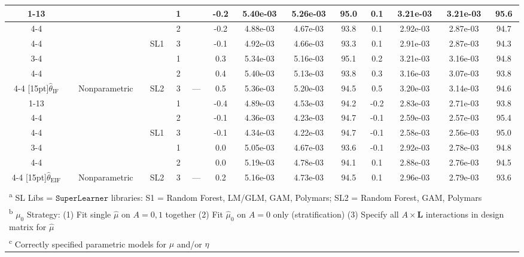 \begin{table}
\begin{tabular}[t]{ccccccccccccc}
\cmidrule{1-13}
 &  &  &  1 &  & -0.2 & 5.40e-03 & 5.26e-03 & 95.0 & 0.1 & 3.21e-03 & 3.21e-03 & 95.6\\
\cmidrule{4-4}
\cmidrule{6-13}
 &  &  &  2 &  & -0.2 & 4.88e-03 & 4.67e-03 & 93.8 & 0.1 & 2.92e-03 & 2.87e-03 & 94.7\\
\cmidrule{4-4}
\cmidrule{6-13}
 &  & \multirow{-3}{*}[5pt]{\centering\arraybackslash SL1} &  3 &  & -0.1 & 4.92e-03 & 4.66e-03 & 93.3 & 0.1 & 2.91e-03 & 2.87e-03 & 94.3\\
\cmidrule{3-4}
\cmidrule{6-13}
 &  &  &  1 &  & 0.3 & 5.34e-03 & 5.16e-03 & 95.1 & 0.2 & 3.21e-03 & 3.16e-03 & 94.8\\
\cmidrule{4-4}
\cmidrule{6-13}
 &  &  &  2 &  & 0.4 & 5.40e-03 & 5.13e-03 & 93.8 & 0.3 & 3.16e-03 & 3.07e-03 & 93.8\\
\cmidrule{4-4}
\cmidrule{6-13}
\multirow{-6}{*}[15pt]{\centering\arraybackslash $\widehat\theta_\text{IF}$} & \multirow{-6}{*}[15pt]{\centering\arraybackslash  Nonparametric} & \multirow{-3}{*}[5pt]{\centering\arraybackslash SL2} &  3 & \multirow{-6}{*}[15pt]{\centering\arraybackslash  ---} & 0.5 & 5.36e-03 & 5.20e-03 & 94.5 & 0.5 & 3.20e-03 & 3.14e-03 & 94.6\\
\cmidrule{1-13}
 &  &  &  1 &  & -0.4 & 4.89e-03 & 4.53e-03 & 94.2 & -0.2 & 2.83e-03 & 2.71e-03 & 93.8\\
\cmidrule{4-4}
\cmidrule{6-13}
 &  &  &  2 &  & -0.1 & 4.36e-03 & 4.23e-03 & 94.7 & -0.1 & 2.59e-03 & 2.57e-03 & 95.4\\
\cmidrule{4-4}
\cmidrule{6-13}
 &  & \multirow{-3}{*}[5pt]{\centering\arraybackslash SL1} &  3 &  & -0.1 & 4.34e-03 & 4.22e-03 & 94.7 & -0.1 & 2.58e-03 & 2.56e-03 & 95.0\\
\cmidrule{3-4}
\cmidrule{6-13}
 &  &  &  1 &  & 0.0 & 5.05e-03 & 4.67e-03 & 93.6 & -0.1 & 2.92e-03 & 2.78e-03 & 94.8\\
\cmidrule{4-4}
\cmidrule{6-13}
 &  &  &  2 &  & 0.0 & 5.19e-03 & 4.78e-03 & 94.1 & 0.1 & 2.88e-03 & 2.76e-03 & 94.5\\
\cmidrule{4-4}
\cmidrule{6-13}
\multirow{-6}{*}[15pt]{\centering\arraybackslash $\widehat\theta_\text{EIF}$} & \multirow{-6}{*}[15pt]{\centering\arraybackslash  Nonparametric} & \multirow{-3}{*}[5pt]{\centering\arraybackslash SL2} &  3 & \multirow{-6}{*}[15pt]{\centering\arraybackslash  ---} & 0.2 & 5.16e-03 & 4.73e-03 & 94.5 & 0.1 & 2.96e-03 & 2.79e-03 & 93.6\\
\bottomrule\\
\multicolumn{13}{l}{\textsuperscript{a} SL Libs = $\texttt{SuperLearner}$ libraries: S1 = {Random Forest, LM/GLM, GAM, Polymars}; SL2 = {Random Forest, GAM, Polymars}}\\
\multicolumn{13}{l}{\textsuperscript{b} $\mu_0$ Strategy: (1) Fit single $\widehat\mu$ on $A = 0,1$ together (2) Fit $\widehat\mu_0$ on $A = 0$ only (stratification) (3) Specify all $A\times\bm L$ interactions in design matrix for $\widehat\mu$}\\
\multicolumn{13}{l}{\textsuperscript{c} Correctly specified parametric models for $\mu$ and/or $\eta$}\\
\end{tabular}
\end{table}
